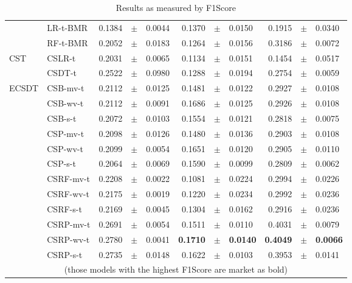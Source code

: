 {\begin{table}[!t]
\begin{tabular}{l l r@{\hskip 0in}c@{\hskip 0in}l r@{\hskip 0in}c@{\hskip 0in}l r@{\hskip 
0in}c@{\hskip 0in}l}
&LR-t-BMR & 0.1384 &$\pm$& 0.0044 & 0.1370 &$\pm$& 0.0150 & 0.1915 &$\pm$& 0.0340 \\
&RF-t-BMR & 0.2052 &$\pm$& 0.0183 & 0.1264 &$\pm$& 0.0156 & 0.3186 &$\pm$& 0.0072\\
\hline 
CST&CSLR-t & 0.2031 &$\pm$& 0.0065 & 0.1134 &$\pm$& 0.0151 & 0.1454 &$\pm$& 0.0517 \\
&CSDT-t & 0.2522 &$\pm$& 0.0980 & 0.1288 &$\pm$& 0.0194 & 0.2754 &$\pm$& 0.0059 \\
\hline 
ECSDT&CSB-mv-t & 0.2112 &$\pm$& 0.0125 & 0.1481 &$\pm$& 0.0122 & 0.2927 &$\pm$& 0.0108 \\
&CSB-wv-t & 0.2112 &$\pm$& 0.0091 & 0.1686 &$\pm$& 0.0125 & 0.2926 &$\pm$& 0.0108 \\
&CSB-s-t & 0.2072 &$\pm$& 0.0103 & 0.1554 &$\pm$& 0.0121 & 0.2818 &$\pm$& 0.0075 \\
&CSP-mv-t & 0.2098 &$\pm$& 0.0126 & 0.1480 &$\pm$& 0.0136 & 0.2903 &$\pm$& 0.0108 \\
&CSP-wv-t & 0.2099 &$\pm$& 0.0054 & 0.1651 &$\pm$& 0.0120 & 0.2905 &$\pm$& 0.0110 \\
&CSP-s-t & 0.2064 &$\pm$& 0.0069 & 0.1590 &$\pm$& 0.0099 & 0.2809 &$\pm$& 0.0062 \\
&CSRF-mv-t & 0.2208 &$\pm$& 0.0022 & 0.1081 &$\pm$& 0.0224 & 0.2994 &$\pm$& 0.0226 \\
&CSRF-wv-t & 0.2175 &$\pm$& 0.0019 & 0.1220 &$\pm$& 0.0234 & 0.2992 &$\pm$& 0.0236 \\
&CSRF-s-t & 0.2169 &$\pm$& 0.0045 & 0.1304 &$\pm$& 0.0162 & 0.2916 &$\pm$& 0.0236 \\
&CSRP-mv-t & 0.2691 &$\pm$& 0.0054 & 0.1511 &$\pm$& 0.0110 & 0.4031 &$\pm$& 0.0079 \\
&CSRP-wv-t & 0.2780 &$\pm$& 0.0041 & \bf{0.1710} &\bf{$\pm$}& \bf{0.0140} & \bf{0.4049} 
&\bf{$\pm$}& \bf{0.0066}\\
&CSRP-s-t & 0.2735 &$\pm$& 0.0148 & 0.1622 &$\pm$& 0.0103 & 0.3953 &$\pm$& 0.0141 \\
      \hline
      \multicolumn{11}{c}{(those models with the highest F1Score are market as bold)}
    \end{tabular}
\caption{Results as measured by F1Score}
\label{tab:9:results_f1score}
  \end{table}

}
